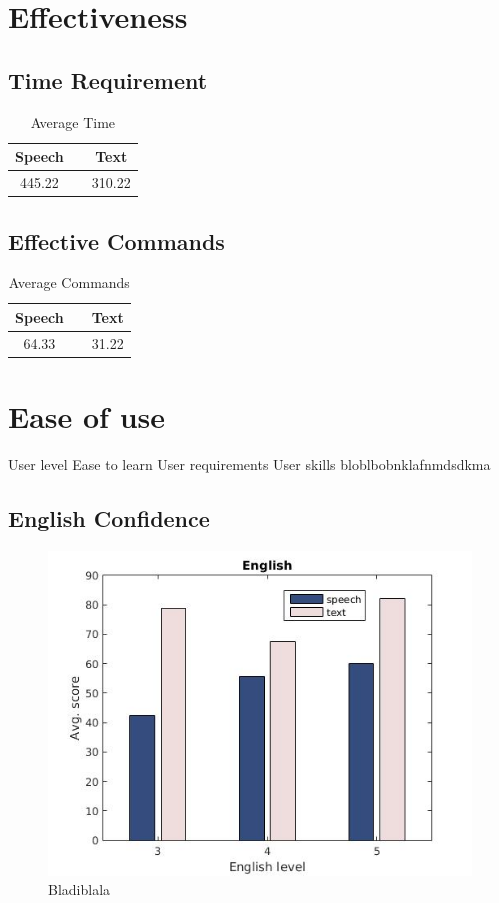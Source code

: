 \section{Effectiveness} 
\subsection{Time Requirement}

\begin{table}[h!]
  \centering
  \label{tab:table1}
  \begin{tabular}{ccc}
    \toprule
    Speech &   & Text\\
    \midrule
    445.22 &   & 310.22\\
    \bottomrule
  \end{tabular}
  \caption{Average Time}
\end{table}

\subsection{Effective Commands}

\begin{table}[h!]
  \centering
  \label{tab:table1}
  \begin{tabular}{ccc}
    \toprule
    Speech &   & Text\\
    \midrule
    64.33 &   & 31.22\\
    \bottomrule
  \end{tabular}
  \caption{Average Commands}
\end{table}

\section{Ease of use}
User level
Ease to learn
User requirements
User skills
bloblbobnklafnmdsdkma
\subsection{English Confidence}

\begin{figure}[p]
  \includegraphics{images/english.jpg}
  \caption{Bladiblala}
\end{figure}

